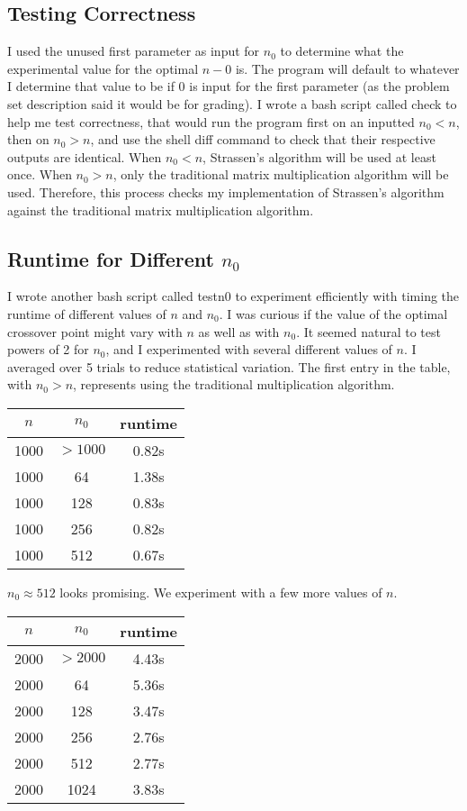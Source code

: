 \documentclass{article}
\begin{document}
\subsection*{Testing Correctness}
I used the unused first parameter as input for $n_0$ to determine what the experimental value for the optimal $n-0$ is. The program will default to whatever I determine that value to be if 0 is input for the first parameter (as the problem set description said it would be for grading). I wrote a bash script called check to help me test correctness, that would run the program first on an inputted $n_0 < n$, then on $n_0 > n$, and use the shell diff command to check that their respective outputs are identical. When $n_0 < n$, Strassen's algorithm will be used at least once. When $n_0 > n$, only the traditional matrix multiplication algorithm will be used. Therefore, this process checks my implementation of Strassen's algorithm against the traditional matrix multiplication algorithm. 
\subsection*{Runtime for Different $n_0$}
I wrote another bash script called testn0 to experiment efficiently with timing the runtime of different values of $n$ and $n_0$. I was curious if the value of the optimal crossover point might vary with $n$ as well as with $n_0$. It seemed natural to test powers of 2 for $n_0$, and I experimented with several different values of $n$. I averaged over 5 trials to reduce statistical variation. The first entry in the table, with $n_0 > n$, represents using the traditional multiplication algorithm.
\begin{center}
\begin{tabular} { |c|c|c| }
\hline
$n$ & $n_0$ & runtime \\
\hline\hline
1000 & $>1000$ & 0.82s \\
\hline\hline
1000 & 64 & 1.38s \\
\hline
1000 & 128 & 0.83s \\
\hline
1000 & 256 & 0.82s \\
\hline
1000 & 512 & 0.67s \\ 
\hline
\end{tabular}
\end{center}
$ n_0 \approx 512$ looks promising. We experiment with a few more values of $n$. 
\begin{center}
\begin{tabular} { |c|c|c| }
\hline
$n$ & $n_0$ & runtime \\
\hline\hline
2000 & $>2000$ & 4.43s \\
\hline\hline
2000 & 64 & 5.36s \\
\hline
2000 & 128 & 3.47s \\
\hline
2000 & 256 & 2.76s\\
\hline
2000 & 512 & 2.77s \\ 
\hline
2000 & 1024 & 3.83s\\
\hline
\end{tabular}
\end{center}
\end{document}
